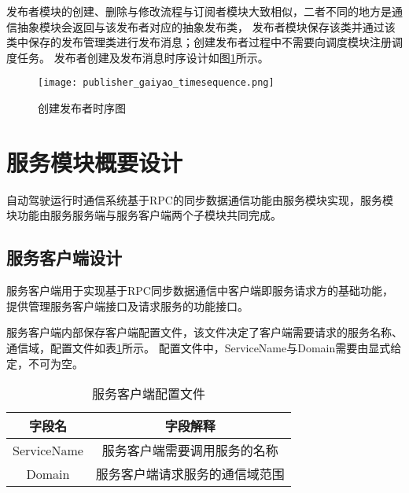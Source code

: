 发布者模块的创建、删除与修改流程与订阅者模块大致相似，二者不同的地方是通信抽象模块会返回与该发布者对应的抽象发布类，
发布者模块保存该类并通过该类中保存的发布管理类进行发布消息；创建发布者过程中不需要向调度模块注册调度任务。
发布者创建及发布消息时序设计如图\ref{publisher_gaiyao_timesequence}所示。

\begin{figure}[H]
  \centering
  \texttt{[image: publisher\_gaiyao\_timesequence.png]}
  \caption{创建发布者时序图}
  \label{publisher_gaiyao_timesequence}
\end{figure}

\section{服务模块概要设计}
自动驾驶运行时通信系统基于RPC的同步数据通信功能由服务模块实现，服务模块功能由服务服务端与服务客户端两个子模块共同完成。

\subsection{服务客户端设计}
服务客户端用于实现基于RPC同步数据通信中客户端即服务请求方的基础功能，提供管理服务客户端接口及请求服务的功能接口。

服务客户端内部保存客户端配置文件，该文件决定了客户端需要请求的服务名称、通信域，配置文件如表\ref{service_client_config_file}所示。
配置文件中，ServiceName与Domain需要由显式给定，不可为空。
\begin{table}[H]
  \centering\small
  \caption{服务客户端配置文件}
  \label{service_client_config_file}
  \renewcommand\arraystretch{1.2}
  \begin{tabular}{cc}
    \toprule
    字段名 & 字段解释 \\
    \midrule
    ServiceName & 服务客户端需要调用服务的名称\\
    Domain & 服务客户端请求服务的通信域范围\\
    \bottomrule
  \end{tabular}
\end{table}

